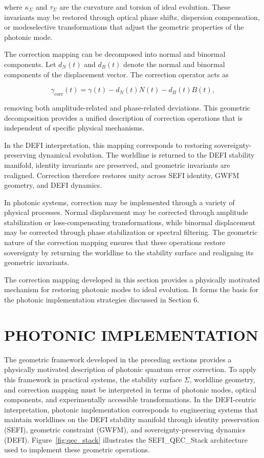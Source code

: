 \documentclass[aip,adv,reprint,floatfix]{revtex4-2}
\begin{document}
where $\kappa_{\Sigma}$ and $\tau_{\Sigma}$ are the curvature and torsion of ideal
evolution.\cite{DuttonElectronField2026} These invariants may be restored through
optical phase shifts, dispersion compensation, or modeselective transformations that adjust the geometric properties of the photonic mode.

The correction mapping can be decomposed into normal and binormal components. Let $d_{N}(t)$ and $d_{B}(t)$ denote the normal and binormal components of the displacement vector. The correction operator acts as


\[
\gamma_{\mathrm{corr}}(t) = \gamma(t) - d_{N}(t) N(t) - d_{B}(t) B(t),
\]


removing both amplitude-related and phase-related deviations.\cite{DuttonElectronField2026} This geometric decomposition provides a unified
description of correction operations that is independent
of specific physical mechanisms.

In the DEFI interpretation, this mapping corresponds
to restoring sovereignty-preserving dynamical evolution.\cite{DuttonSEFI2026}
The worldline is returned to the DEFI stability manifold,
identity invariants are preserved, and geometric invariants are realigned. Correction therefore restores unity
across SEFI identity, GWFM geometry, and DEFI dynamics.

In photonic systems, correction may be implemented
through a variety of physical processes.\cite{DuttonElectronField2026}
Normal displacement may be corrected through amplitude stabilization or loss-compensating transformations, while binormal displacement may be corrected through phase stabilization or spectral filtering. The geometric nature of the
correction mapping ensures that these operations restore
sovereignty by returning the worldline to the stability
surface and realigning its geometric invariants.

The correction mapping developed in this section provides a physically motivated mechanism for restoring
photonic modes to ideal evolution. It forms the basis
for the photonic implementation strategies discussed in
Section 6.
\section{PHOTONIC IMPLEMENTATION}

The geometric framework developed in the preceding sections provides a physically motivated description
of photonic quantum error correction.\cite{DuttonSEFI2026,DuttonElectronField2026}
To apply this
framework in practical systems, the stability surface $\Sigma$,
worldline geometry, and correction mapping must be interpreted in terms of photonic modes, optical components, and experimentally accessible transformations. In
the DEFI-centric interpretation, photonic implementation corresponds to engineering systems that maintain
worldlines on the DEFI stability manifold through identity preservation (SEFI), geometric constraint (GWFM),
and sovereignty-preserving dynamics (DEFI). Figure~\ref{fig:qec_stack}
illustrates the SEFI\_QEC\_Stack architecture used to implement
these geometric operations.
\end{document}
